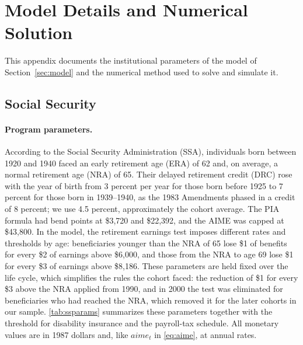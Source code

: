 \section{Model Details and Numerical Solution}\label{app:model}

This appendix documents the institutional parameters of the model of Section~\ref{sec:model} and the numerical method used to solve and simulate it.

\subsection{Social Security}\label{app:model_ss}

\paragraph{Program parameters.} According to the Social Security Administration (SSA), individuals born between 1920 and 1940 faced an early retirement age (ERA) of 62 and, on average, a normal retirement age (NRA) of 65. Their delayed retirement credit (DRC) rose with the year of birth from 3 percent per year for those born before 1925 to 7 percent for those born in 1939--1940, as the 1983 Amendments phased in a credit of 8 percent; we use 4.5 percent, approximately the cohort average. %
 The PIA formula had bend points at \$3,720 and \$22,392, and the AIME was capped at \$43,800. In the model, the retirement earnings test imposes different rates and thresholds by age: beneficiaries younger than the NRA of 65 lose \$1 of benefits for every \$2 of earnings above \$6,000, and those from the NRA to age 69 lose \$1 for every \$3 of earnings above \$8,186. %
 These parameters are held fixed over the life cycle, which simplifies the rules the cohort faced: the reduction of \$1 for every \$3 above the NRA applied from 1990, and in 2000 the test was eliminated for beneficiaries who had reached the NRA, which removed it for the later cohorts in our sample. \autoref{tab:ssparams} summarizes these parameters together with the threshold for disability insurance and the payroll-tax schedule. All monetary values are in 1987 dollars and, like $aime_t$ in \eqref{eq:aime}, at annual rates.

